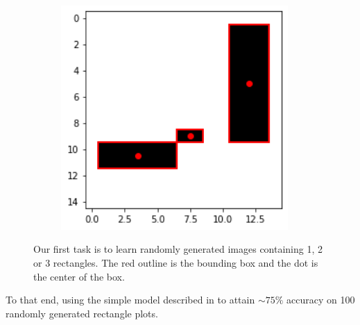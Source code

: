 \begin{figure}[htbp]
\begin{subfigure}{0.32\textwidth}
    \end{subfigure}
    \hfill
    \begin{subfigure}{0.32\textwidth}
        \centering
        \includegraphics[width=0.95\textwidth]{images/faceDetec/loss-function/rectangle-example-3.png}
    \end{subfigure}
    \caption{Our first task is to learn randomly generated images containing 1, 2 or 3 rectangles. The red outline is the bounding box and the dot is the center of the box.}
    \label{Figure:Face-Detection:loss-function:rectangles-example}
\end{figure}

To that end, using the simple model described in  to attain $\sim75\%$ accuracy on 100 randomly generated rectangle plots.

